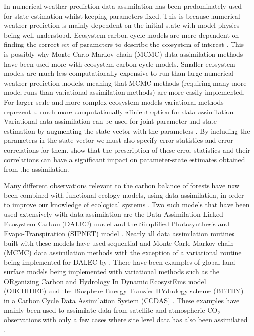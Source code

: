 In numerical weather prediction data assimilation has been predominately used for state estimation whilst keeping parameters fixed. This is because numerical weather prediction is mainly dependent on the initial state with model physics being well understood. Ecosystem carbon cycle models are more dependent on finding the correct set of parameters to describe the ecosystem of interest \citep{luo2015predictability}. This is possibly why Monte Carlo Markov chain (MCMC) data assimilation methods have been used more with ecosystem carbon cycle models. Smaller ecosystem models are much less computationally expensive to run than large numerical weather prediction models, meaning that MCMC methods (requiring many more model runs than variational assimilation methods) are more easily implemented. For larger scale and more complex ecosystem models variational methods represent a much more computationally efficient option for data assimilation. Variational data assimilation can be used for joint parameter and state estimation by augmenting the state vector with the parameters \citep{navon1998practical}. By including the parameters in the state vector we must also specify error statistics and error correlations for them. \citet{smith2009variational} show that the prescription of these error statistics and their correlations can have a significant impact on parameter-state estimates obtained from the assimilation.

Many different observations relevant to the carbon balance of forests have now been combined with functional ecology models, using data assimilation, in order to improve our knowledge of ecological systems \citep{zobitz2011primer, fox2009reflex, richardson2010estimating, Quaife2008, Zobitz2014, Niu2014}. Two such models that have been used extensively with data assimilation are the Data Assimilation Linked Ecosystem Carbon (DALEC) model \citep{williams2005improved} and the Simplified Photosynthesis and Evapo-Transpiration (SIPNET) model \citep{braswell2005estimating}. Nearly all data assimilation routines built with these models have used sequential and Monte Carlo Markov chain (MCMC) data assimilation methods with the exception of a variational routine being implemented for DALEC by \citet{delahaies2013regularization}. There have been examples of global land surface models being implemented with variational methods such as the ORganizing Carbon and Hydrology In Dynamic EcosystEms model (ORCHIDEE) \citep{Krinner2005} and the Biosphere Energy Transfer HYdrology scheme (BETHY) in a Carbon Cycle Data Assimilation System (CCDAS) \citep{Kaminski2013}. These examples have mainly been used to assimilate data from satellite and atmospheric $\text{CO}_{2}$ observations with only a few cases where site level data has also been assimilated \citep{Verbeeck2011, Bacour2015}. 

